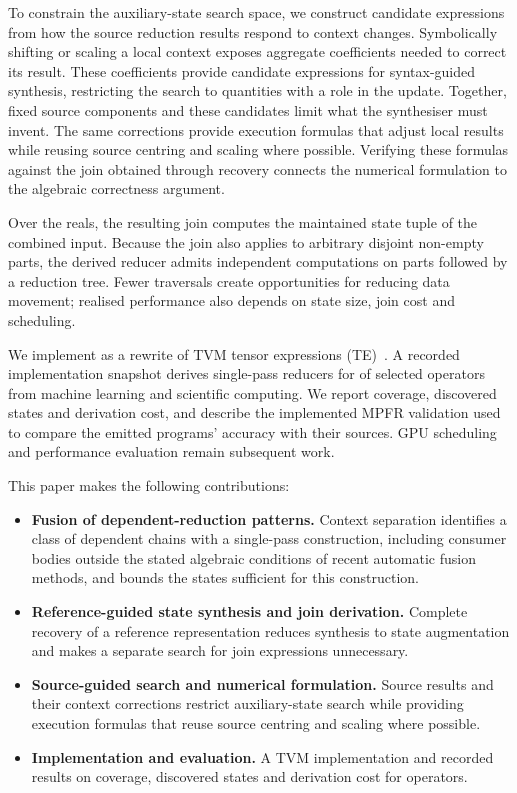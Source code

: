 To constrain the auxiliary-state search space, we construct candidate expressions from how the source reduction results respond to context changes.
Symbolically shifting or scaling a local context exposes aggregate coefficients needed to correct its result.
These coefficients provide candidate expressions for syntax-guided synthesis, restricting the search to quantities with a role in the update.
Together, fixed source components and these candidates limit what the synthesiser must invent.
The same corrections provide execution formulas that adjust local results while reusing source centring and scaling where possible.
Verifying these formulas against the join obtained through recovery connects the numerical formulation to the algebraic correctness argument.

Over the reals, the resulting join computes the maintained state tuple of the combined input.
Because the join also applies to arbitrary disjoint non-empty parts, the derived reducer admits independent computations on parts followed by a reduction tree.
Fewer traversals create opportunities for reducing data movement; realised performance also depends on state size, join cost and scheduling.

We implement \sys as a rewrite of TVM tensor expressions (TE)~\citep{tvm}.
A recorded implementation snapshot derives single-pass reducers for \nShowFused of \nShowcase selected operators from machine learning and scientific computing.
We report coverage, discovered states and derivation cost, and describe the implemented MPFR validation used to compare the emitted programs' accuracy with their sources.
GPU scheduling and performance evaluation remain subsequent work.

\noindent This paper makes the following contributions:
\begin{itemize}
\item \textbf{Fusion of dependent-reduction patterns.}
Context separation identifies a class of dependent chains with a single-pass construction, including consumer bodies outside the stated algebraic conditions of recent automatic fusion methods, and bounds the states sufficient for this construction.
\item \textbf{Reference-guided state synthesis and join derivation.}
Complete recovery of a reference representation reduces synthesis to state augmentation and makes a separate search for join expressions unnecessary.
\item \textbf{Source-guided search and numerical formulation.}
Source results and their context corrections restrict auxiliary-state search while providing execution formulas that reuse source centring and scaling where possible.
\item \textbf{Implementation and evaluation.}
A TVM implementation and recorded results on coverage, discovered states and derivation cost for \nShowcase operators.
\end{itemize}
